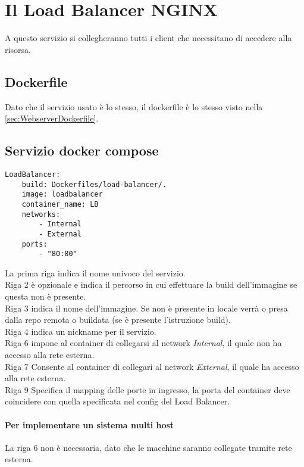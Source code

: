 \documentclass[../DocumentazioneProgetto.tex]{subfiles}
\begin{document}
	\section{Il Load Balancer NGINX} 
	A questo servizio si collegheranno tutti i client che necessitano di accedere alla risorsa.
	\subsection{Dockerfile} 
	Dato che il servizio usato è lo stesso, il dockerfile è lo stesso visto nella \autoref{sec:WebserverDockerfile}.
	\subsection{Servizio docker compose}
	\label{sec:LoadBalancerDockerCompose}
	\begin{lstlisting}[caption=Load Balancer Docker Compose] 
LoadBalancer:
	build: Dockerfiles/load-balancer/.
	image: loadbalancer
	container_name: LB
	networks:
		- Internal
		- External
	ports:
		- "80:80"\end{lstlisting}
		La prima riga indica il nome univoco del servizio.\\
		Riga 2 è opzionale e indica il percorso in cui effettuare la build dell'immagine se questa non è presente.\\
		Riga 3 indica il nome dell'immagine. Se non è presente in locale verrà o presa dalla repo remota o buildata (se è presente l'istruzione build).\\
		Riga 4 indica un nickname per il servizio.\\
		Riga 6 impone al container di collegarsi al network \textit{Internal}, il quale non ha accesso alla rete esterna.\\
		Riga 7 Consente al container di collegari al network \textit{External}, il quale ha accesso alla rete esterna.\\
		Riga 9 Specifica il mapping delle porte in ingresso, la porta del container deve coincidere con quella specificata nel config del Load Balancer.
	\paragraph{Per implementare un sistema multi host} 
	La riga 6 non è necessaria, dato che le macchine saranno collegate tramite rete esterna.
\end{document}
